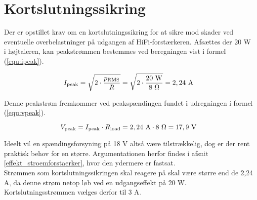 \section{Kortslutningssikring}
\label{valg_kortslutningssikring}
Der er opstillet krav om en kortslutningssikring for at sikre mod skader ved eventuelle overbelastninger på udgangen af HiFi-forstærkeren. Afsættes der 20 W i højtaleren, kan peakstrømmen bestemmes ved beregningen vist i formel (\ref{equ:ipeak}).

\begin{equation}
\label{equ:ipeak}
I_{\mathrm{peak}} = \sqrt{2 \cdot \frac{p_{\mathrm{RMS}}}{R}} = \sqrt{2 \cdot \frac{\mathrm{20~W}}{8~\ohm}}  = \mathrm{2,24~A}
\end{equation}

Denne peakstrøm fremkommer ved peakspændingen fundet i udregningen i formel (\ref{equ:vpeak}).

\begin{equation}
\label{equ:vpeak}
V_{\mathrm{peak}} = I_{\mathrm{peak}} \cdot R_{\mathrm{load}} = \mathrm{2,24~A \cdot 8~\ohm = 17,9~V}
\end{equation}

Ideelt vil en spændingsforsyning på 18 V altså være tilstrækkelig, dog er der rent praktisk behov for en større. Argumentationen herfor findes i afsnit \ref{effekt_stroemforstaerker}, hvor den ydermere er fastsat.\\
Strømmen som kortslutningssikringen skal reagere på skal være større end de 2,24 A, da denne strøm netop løb ved en udgangseffekt på 20 W. Kortslutningsstrømmen vælges derfor til 3 A. 